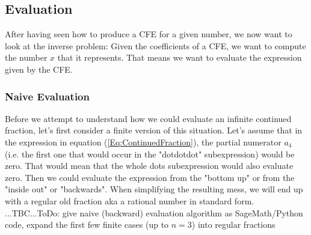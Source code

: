








\subsection{Evaluation}
After having seen how to produce a CFE for a given number, we now want to look at the inverse problem: Given the coefficients of a CFE, we want to compute the number $x$ that it represents. That means we want to evaluate the expression given by the CFE.

\subsubsection{Naive Evaluation}
Before we attempt to understand how we could evaluate an infinite continued fraction, let's first consider a finite version of this situation. Let's assume that in the expression in equation (\ref{Eq:ContinuedFraction}), the partial numerator $a_4$ (i.e. the first one that would occur in the "dotdotdot" subexpression) would be zero. That would mean that the whole dots subexpression would also evaluate zero. Then we could evaluate the expression from the "bottom up" or from the "inside out" or "backwards". When simplifying the resulting mess, we will end up with a regular old fraction aka a rational number in standard form. ...TBC...ToDo: give naive (backward) evaluation algorithm as SageMath/Python code, expand the first few finite cases (up to $n=3$) into regular fractions



